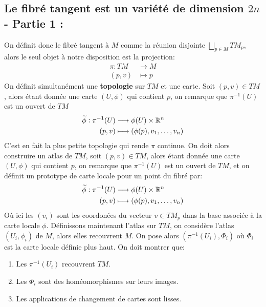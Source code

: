    \subsection*{Le fibré tangent est un variété de dimension \( 2n \) - Partie 1 {:}}
      On définit donc le fibré tangent à \( M \) comme la réunion disjointe \( \bigsqcup_{p \in M} TM_p \), alors le seul objet à notre disposition est la projection:
      \[ 
         \begin{aligned}
            \pi : TM &\longrightarrow M \\
            (p, v) &\longmapsto p
         \end{aligned} 
      \]
      On définit simultanément une \textbf{topologie} sur \( TM \) et une carte. Soit \( (p, v) \in TM\), alors étant donnée une carte \( (U, \phi) \) qui contient \( p \), on remarque que \( \pi^{-1}(U) \) est un ouvert de \( TM \)
      \[ 
         \begin{aligned}
            \widetilde{\phi} : \pi^{-1}(U) &\longrightarrow \phi(U) \times \mathbb{R}^n \\
            (p, v) &\longmapsto (\phi(p), v_1, \ldots, v_n)
         \end{aligned}         
      \]
         C'est en fait la plus petite topologie qui rende \( \pi \) continue.
         On doit alors construire un atlas de \( TM \), soit \( (p, v) \in TM\), alors étant donnée une carte \( (U, \phi) \) qui contient \( p \), on remarque que \( \pi^{-1}(U) \) est un ouvert de \( TM \), et on définit un prototype de carte locale pour un point du fibré par:
         \[ 
            \begin{aligned}
               \widetilde{\phi} : \pi^{-1}(U) &\longrightarrow \phi(U) \times \mathbb{R}^n \\
               (p, v) &\longmapsto (\phi(p), v_1, \ldots, v_n)
            \end{aligned}
         \]
         Où ici les \( (v_i) \) sont les coordonées du vecteur \( v \in TM_p \) dans la base associée à la carte locale \( \phi \).
      Définissons maintenant l'atlas sur \( TM \), on considère l'atlas \( (U_i, \phi_i) \) de \( M \), alors elles recouvrent \( M \). On pose alors \((\pi^{-1}(U_i), \Phi_i)\) où \( \Phi_i \) est la carte locale définie plus haut. On doit montrer que:
      \begin{enumerate}
         \item Les \( \pi^{-1}(U_i) \) recouvrent \( TM \).
         \item Les \( \Phi_i \) sont des homéomorphismes sur leurs images.
         \item Les applications de changement de cartes sont lisses.
      \end{enumerate}
